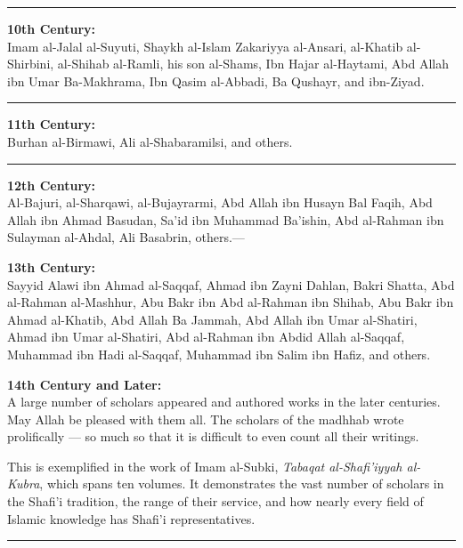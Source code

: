 \documentclass[
  a4paper,
  DIV=11,
  numbers=noendperiod]{scrartcl}
\begin{document}
\begin{center}\rule{0.5\linewidth}{0.5pt}\end{center}

\textbf{10th Century:}\\
Imam al-Jalal al-Suyuti, Shaykh al-Islam Zakariyya al-Ansari, al-Khatib
al-Shirbini, al-Shihab al-Ramli, his son al-Shams, Ibn Hajar al-Haytami,
Abd Allah ibn Umar Ba-Makhrama, Ibn Qasim al-Abbadi, Ba Qushayr, and
ibn-Ziyad.

\begin{center}\rule{0.5\linewidth}{0.5pt}\end{center}

\textbf{11th Century:}\\
Burhan al-Birmawi, Ali al-Shabaramilsi, and others.

\begin{center}\rule{0.5\linewidth}{0.5pt}\end{center}

\textbf{12th Century:}\\
Al-Bajuri, al-Sharqawi, al-Bujayrarmi, Abd Allah ibn Husayn Bal Faqih,
Abd Allah ibn Ahmad Basudan, Sa'id ibn Muhammad Ba'ishin, Abd al-Rahman
ibn Sulayman al-Ahdal, Ali Basabrin, others.---

\textbf{13th Century:}\\
Sayyid Alawi ibn Ahmad al-Saqqaf, Ahmad ibn Zayni Dahlan, Bakri Shatta,
Abd al-Rahman al-Mashhur, Abu Bakr ibn Abd al-Rahman ibn Shihab, Abu
Bakr ibn Ahmad al-Khatib, Abd Allah Ba Jammah, Abd Allah ibn Umar
al-Shatiri, Ahmad ibn Umar al-Shatiri, Abd al-Rahman ibn Abdid Allah
al-Saqqaf, Muhammad ibn Hadi al-Saqqaf, Muhammad ibn Salim ibn Hafiz,
and others.

\textbf{14th Century and Later:}\\
A large number of scholars appeared and authored works in the later
centuries. May Allah be pleased with them all. The scholars of the
madhhab wrote prolifically --- so much so that it is difficult to even
count all their writings.

This is exemplified in the work of Imam al-Subki, \emph{Tabaqat
al-Shafi'iyyah al-Kubra}, which spans ten volumes. It demonstrates the
vast number of scholars in the Shafi'i tradition, the range of their
service, and how nearly every field of Islamic knowledge has Shafi'i
representatives.

\begin{center}\rule{0.5\linewidth}{0.5pt}\end{center}
\end{document}
